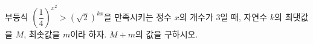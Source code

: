 부등식 $\left(\dfrac{1}{4}\right)^{x^{2}}>(\sqrt{2})^{kx}$을 만족시키는 정수 $x$의 개수가 $3$일 때, 자연수 $k$의 최댓값을 $M$, 최솟값을 $m$이라 하자. $M+m$의 값을 구하시오.
